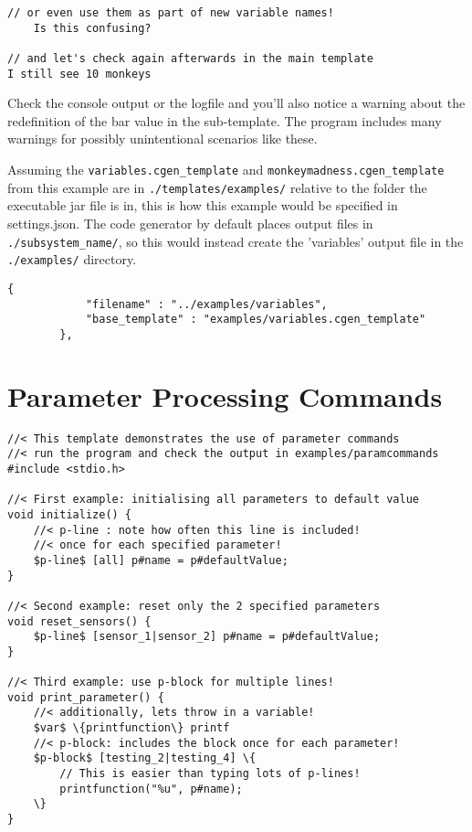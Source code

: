 \documentclass{settings/TU_Delft_Report}
\begin{document}
\begin{appendices}
\begin{lstlisting}[caption={result},label={ex1:result},language={}]
	// or even use them as part of new variable names!
	Is this confusing?

// and let's check again afterwards in the main template
I still see 10 monkeys

\end{lstlisting}

Check the console output or the logfile and you'll also notice a warning about the redefinition of the bar value in the sub-template. The program includes many warnings for possibly unintentional scenarios like these.

\noindent Assuming the \lstinline{variables.cgen_template} and \lstinline{monkeymadness.cgen_template} from this example are in \lstinline{./templates/examples/} relative to the folder the executable jar file is in, this is how this example would be specified in settings.json. The code generator by default places output files in \lstinline{./subsystem_name/}, so this would instead create the 'variables' output file in the \lstinline{./examples/} directory.

\begin{lstlisting}[caption={specifying this example in settings.json}, language = {}]
		{
			"filename" : "../examples/variables",
			"base_template" : "examples/variables.cgen_template"
		},
\end{lstlisting}

\newpage
\section{Parameter Processing Commands}
\begin{lstlisting}[caption={parameter commands example}, language = {}]
//< This template demonstrates the use of parameter commands
//< run the program and check the output in examples/paramcommands
#include <stdio.h>

//< First example: initialising all parameters to default value
void initialize() {
	//< p-line : note how often this line is included!
	//< once for each specified parameter!
	$p-line$ [all] p#name = p#defaultValue;
}

//< Second example: reset only the 2 specified parameters
void reset_sensors() {
	$p-line$ [sensor_1|sensor_2] p#name = p#defaultValue;
}

//< Third example: use p-block for multiple lines!
void print_parameter() {
	//< additionally, lets throw in a variable!
	$var$ \{printfunction\} printf
	//< p-block: includes the block once for each parameter!
	$p-block$ [testing_2|testing_4] \{
		// This is easier than typing lots of p-lines!
		printfunction("%u", p#name);
	\}
}


\end{lstlisting}
\end{appendices}
\end{document}
